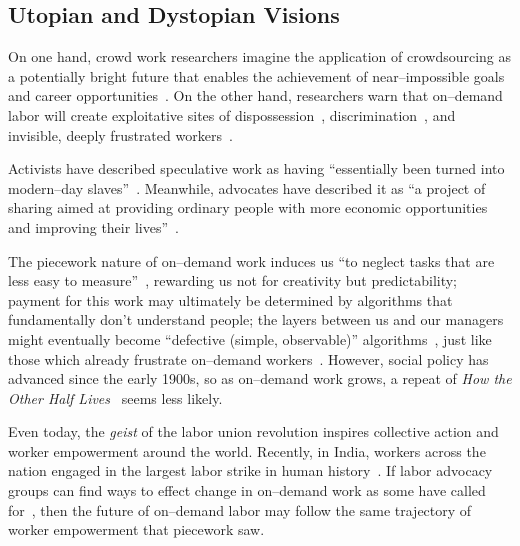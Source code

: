 \documentclass[trackingWork]{subfiles}
\begin{document}
\subsection{Utopian and Dystopian Visions}\label{sec:polarizationOfCrowdWork}
On one hand, crowd work researchers
imagine the application of crowdsourcing as
a potentially bright future that enables the achievement of near--impossible goals and career opportunities~\cite{redballoon,crowdworkFuture,vizwiz,suzukiAtelier}.
On the other hand, researchers
warn that on--demand labor will create exploitative sites of dispossession~\cite{scholz2012digital},
discrimination~\cite{edelman2015racial},
and invisible, deeply frustrated workers~\cite{turkopticon,bighamHalfWorkday}.

Activists have described speculative work as having
``essentially been turned into modern--day slaves''~\cite{activistsHuffPoLawsuit}.
Meanwhile, advocates have described it as
``a project of sharing aimed at providing ordinary people with more economic opportunities and improving their lives''~\cite{uberPropaganda}.

The piecework nature of on--demand work induces us
``to neglect tasks that are less easy to measure''~\cite{SJOE:SJOE371},
rewarding us not for creativity but predictability;
payment for this work may ultimately be determined by
algorithms that fundamentally don't understand people;
the layers between us and our managers might eventually become
``defective (simple, observable)'' algorithms~\cite{10.2307/2555446},
just like those which already frustrate
on--demand workers~\cite{uberAlgorithm,dynamo,turkopticon}.
However, social policy has advanced since the early 1900s, so as on--demand work grows, a repeat of \textit{How the Other Half Lives}~\cite{riisOtherSideLives} seems less likely.

Even today, the \textit{geist} of the labor union revolution
inspires collective action and worker empowerment around the world.
Recently, in India, workers across the nation engaged in
the largest labor strike in human history~\cite{indiaStrikeRealNews}.
If labor advocacy groups can find ways to effect change in on--demand work as some have called for~\cite{futureUnions},
then the future of on--demand labor may follow
the same trajectory of worker empowerment that piecework saw.
\end{document}

